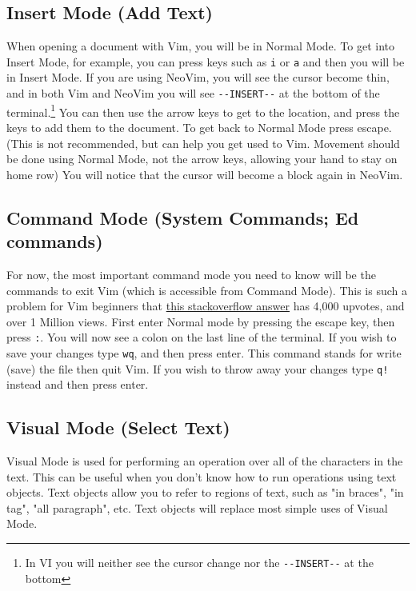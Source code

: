 \documentclass[11pt]{article}
\begin{document}
\subsection{Insert Mode (Add Text)}
\label{sec:orgbe2b424}
When opening a document with Vim, you will be in Normal Mode. To get into Insert
Mode, for example, you can press keys such as \texttt{i} or \texttt{a} and then you will be in
Insert Mode. If you are using NeoVim, you will see the cursor become thin, and
in both Vim and NeoVim you will see \texttt{-{}-INSERT-{}-} at the bottom of the
terminal.\footnote{In VI you will neither see the cursor change nor the \texttt{-{}-INSERT-{}-} at the bottom} You can then use the arrow keys to get to the location, and
press the keys to add them to the document. To get back to Normal Mode press
escape. (This is not recommended, but can help you get used to Vim. Movement
should be done using Normal Mode, not the arrow keys, allowing your hand to stay
on home row) You will notice that the cursor will become a block again in
NeoVim.
\subsection{Command Mode (System Commands; Ed commands)}
\label{sec:orgd71327b}
For now, the most important command mode you need to know will be the commands
to exit Vim (which is accessible from Command Mode). This is such a problem for
Vim beginners that \href{https://stackoverflow.com/questions/11828270/how-to-exit-the-vim-editor}{this stackoverflow answer} has 4,000 upvotes, and over 1
Million views. First enter Normal mode by pressing the escape key, then press
\texttt{:}. You will now see a colon on the last line of the terminal. If you wish to
save your changes type \texttt{wq}, and then press enter. This command stands for write
(save) the file then quit Vim. If you wish to throw away your changes type \texttt{q!}
instead and then press enter.
\subsection{Visual Mode (Select Text)}
\label{sec:orge773c34}
Visual Mode is used for performing an operation over all of the characters in
the text. This can be useful when you don't know how to run operations using
text objects. Text objects allow you to refer to regions of text, such as "in
braces", "in tag", "all paragraph", etc. Text objects will replace most simple
uses of Visual Mode.
\end{document}
